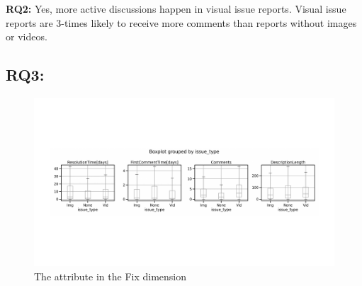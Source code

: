 \summarybox
{{\bf RQ2: }{Yes, more active discussions happen in visual issue reports. Visual issue reports are 3-times likely to receive more comments than reports without images or videos. }
}









\subsection*{RQ3: \RQthree{}}
\begin{figure}[t]
    \centering
    \includegraphics[width=0.5\linewidth]{./figures/fixes.pdf}
    \caption{The attribute in the Fix dimension}
    \label{fig:resolvedtime}
\end{figure}


